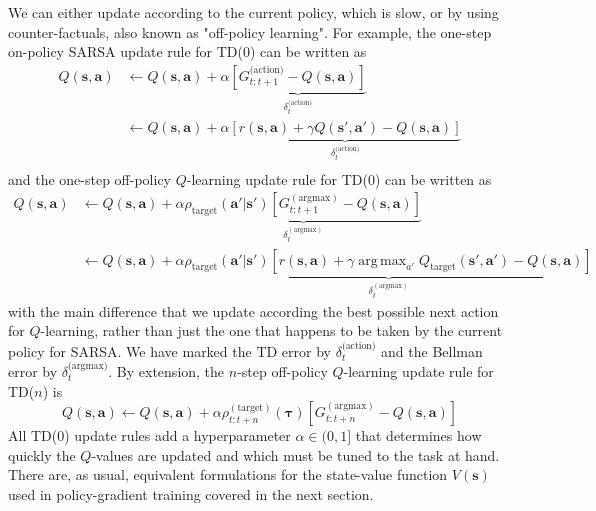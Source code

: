 \documentclass{article}
\DeclareMathOperator*{\argmax}{arg\,max}
\begin{document}
We can either update according to the current policy, which is slow, or by using counter-factuals, also known as "off-policy learning". For example, the one-step on-policy SARSA update rule for TD(0) can be written as
\begin{equation}
\label{eq:SARSA_update}
\begin{split}
Q(\mathbf{s},\mathbf{a})&\leftarrow Q(\mathbf{s},\mathbf{a})+\alpha\underbrace{\left[G_{t:t+1}^\text{(action)}-Q(\mathbf{s},\mathbf{a})\right]}_\text{$\delta_t^\text{(action)}$}\\
&\leftarrow Q(\mathbf{s},\mathbf{a})+\alpha\underbrace{\left[r(\mathbf{s},\mathbf{a})+\gamma Q(\mathbf{s}',\mathbf{a}')-Q(\mathbf{s},\mathbf{a})\right]}_\text{$\delta_t^\text{(action)}$}\\
\end{split}
\end{equation}and the one-step off-policy $Q$-learning update rule for TD(0) can be written as
\begin{equation}\begin{split}\label{eq:q_learning_update}
Q(\mathbf{s},\mathbf{a})&\leftarrow Q(\mathbf{s},\mathbf{a})+\alpha\underbrace{\rho_\text{target}(\mathbf{a}'|\mathbf{s}')\left[G_{t:t+1}^{(\text{argmax})}-Q(\mathbf{s},\mathbf{a})\right]}_{\delta_t^{(\text{argmax})}}\\&\leftarrow Q(\mathbf{s},\mathbf{a})+\alpha\underbrace{\rho_\text{target}(\mathbf{a}'|\mathbf{s}')\left[r(\mathbf{s},\mathbf{a})+\gamma \argmax_{a'}Q_\text{target}(\mathbf{s}',\mathbf{a}')-Q(\mathbf{s},\mathbf{a})\right]}_{\delta_t^{(\text{argmax})}}
\end{split}\end{equation}with the main difference that we update according the best possible next action for $Q$-learning, rather than just the one that happens to be taken by the current policy for SARSA. We have marked the TD error by $\delta_t^\text{(action)}$ and the Bellman error by $\delta_t^\text{(argmax)}$. By extension, the $n$-step off-policy $Q$-learning update rule for TD($n$) is
\begin{equation}\label{eq:n_step_q_learning_update}
Q(\mathbf{s},\mathbf{a})\leftarrow Q(\mathbf{s},\mathbf{a})+\alpha\rho^{(\text{target})}_{ t:t+n}(\boldsymbol{\tau})\left[G_{t:t+n}^{(\text{argmax})}-Q(\mathbf{s},\mathbf{a})\right]\end{equation}All TD(0) update rules add a hyperparameter $\alpha\in(0,1]$ that determines how quickly the $Q$-values are updated and which must be tuned to the task at hand. There are, as usual, equivalent formulations for the state-value function $V(\mathbf{s})$ used in policy-gradient training covered in the next section.
\end{document}
